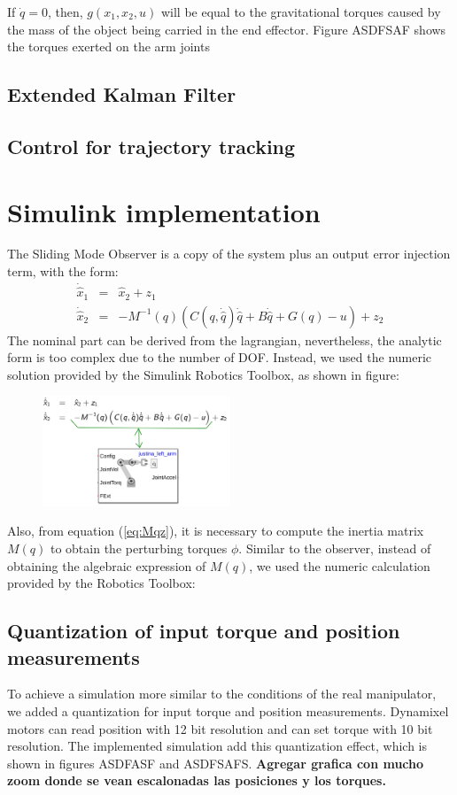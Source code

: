 \documentclass[a4paper, 10pt]{article}
\begin{document}
If $\dot{q}=0$, then, $g(x_1, x_2, u)$ will be equal to the gravitational torques caused by the mass of the object being carried in the end effector. Figure ASDFSAF shows the torques exerted on the arm joints 

\subsection{Extended Kalman Filter}

\subsection{Control for trajectory tracking}

\section{Simulink implementation}
The Sliding Mode Observer is a copy of the system plus an output error injection term, with the form:
  \begin{eqnarray}
    \dot{\hat{x}}_1 &=& \hat{x}_2 + z_1\label{eq:observer1}\\
    \dot{\hat{x}}_2 &=& -M^{-1}(q)\left(C(q, \dot{\hat{q}})\dot{\hat{q}} + B\dot{\hat{q}} + G(q) - u\right) + z_2\label{eq:observer2}
  \end{eqnarray}
  The nominal part can be derived from the lagrangian, nevertheless, the analytic form is too complex due to the number of DOF. Instead, we used the numeric solution provided by the Simulink Robotics Toolbox, as shown in figure:
  \begin{figure}
    \centering
    \includegraphics[width=0.5\textwidth]{Figures/SMOwithSimulink.png}
  \end{figure}

  Also, from equation (\ref{eq:Mqz}), it is necessary to compute the inertia matrix $M(q)$ to obtain the perturbing torques $\phi$. Similar to the observer, instead of obtaining the algebraic expression of $M(q)$, we used the numeric calculation provided by the Robotics Toolbox:

\subsection{Quantization of input torque and position measurements}
To achieve a simulation more similar to the conditions of the real manipulator, we added a quantization for input torque and position measurements. Dynamixel motors can read position with 12 bit resolution and can set torque with 10 bit resolution. The implemented simulation add this quantization effect, which is shown in figures ASDFASF and ASDFSAFS. 
\textbf{Agregar grafica con mucho zoom donde se vean escalonadas las posiciones y los torques. }
\end{document}

